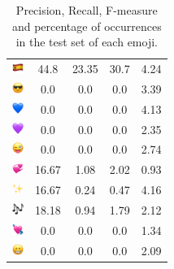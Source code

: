 \documentclass{article}
\begin{document}
\begin{table}
\begin{tabular}{|c|ccc|c|}
\includegraphics[height=0.37cm,width=0.37cm]{img/Spain.png} & 44.8 & 23.35 & 30.7 & 4.24\\ 
\includegraphics[height=0.37cm,width=0.37cm]{img/smiling_face_with_sunglasses.png} & 0.0 & 0.0 & 0.0 & 3.39\\ 
\includegraphics[height=0.37cm,width=0.37cm]{img/blue_heart.png} & 0.0 & 0.0 & 0.0 & 4.13\\ 
\includegraphics[height=0.37cm,width=0.37cm]{img/purple_heart.png} & 0.0 & 0.0 & 0.0 & 2.35\\ 
\includegraphics[height=0.37cm,width=0.37cm]{img/winking_face_with_tongue.png} & 0.0 & 0.0 & 0.0 & 2.74\\ 
\includegraphics[height=0.37cm,width=0.37cm]{img/revolving_hearts.png} & 16.67 & 1.08 & 2.02 & 0.93\\ 
\includegraphics[height=0.37cm,width=0.37cm]{img/sparkles.png} & 16.67 & 0.24 & 0.47 & 4.16\\ 
\includegraphics[height=0.37cm,width=0.37cm]{img/musical_notes.png} & 18.18 & 0.94 & 1.79 & 2.12\\ 
\includegraphics[height=0.37cm,width=0.37cm]{img/heart_with_arrow.png} & 0.0 & 0.0 & 0.0 & 1.34\\ 
\includegraphics[height=0.37cm,width=0.37cm]{img/beaming_face_with_smiling_eyes.png} & 0.0 & 0.0 & 0.0 & 2.09\\ 

\hline
\end{tabular}
\caption{\label{table:emoji_detailed} Precision, Recall, F-measure and percentage of occurrences in the test set of each emoji.}
\end{table}
\end{document}
